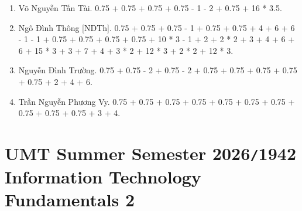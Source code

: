 \documentclass{article}
\begin{document}
\begin{enumerate}
	\item {\sc Võ Nguyễn Tấn Tài.} 0.75 + 0.75 + 0.75 + 0.75 - 1 - 2 + 0.75 + 16 * 3.5.
	\item {\sc Ngô Đình Thông [NDTh].} 0.75 + 0.75 + 0.75 - 1 + 0.75 + 0.75 + 4 + 6 + 6 - 1 - 1 + 0.75 + 0.75 + 0.75 + 0.75 + 10 * 3 - 1 + 2 + 2 * 2 + 3 + 4 + 6 + 6 + 15 * 3 + 3 + 7 + 4 + 3 * 2 + 12 * 3 + 2 * 2 + 12 * 3.
	\item {\sc Nguyễn Đình Trường.} 0.75 + 0.75 - 2 + 0.75 - 2 + 0.75 + 0.75 + 0.75 + 0.75 + 0.75 + 2 + 4 + 6.
	\item {\sc Trần Nguyễn Phương Vy.} 0.75 + 0.75 + 0.75 + 0.75 + 0.75 + 0.75 + 0.75 + 0.75 + 0.75 + 0.75 + 3 + 4.
\end{enumerate}


\section{UMT Summer Semester 2026{\tt/}1942 Information Technology Fundamentals 2}
\end{document}
